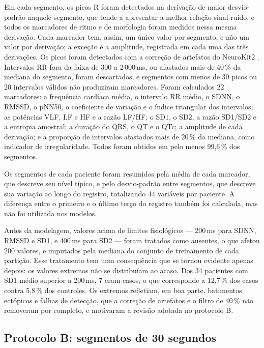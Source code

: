 Em cada segmento, os picos R foram detectados na derivação de maior
desvio-padrão naquele segmento, que tende a apresentar a melhor relação
sinal-ruído, e todos os marcadores de ritmo e de morfologia foram medidos
nessa mesma derivação. Cada marcador tem, assim, um único valor por
segmento, e não um valor por derivação; a exceção é a amplitude, registrada
em cada uma das três derivações. Os picos foram detectados com a
correção de artefatos do NeuroKit2 \cite{lipponen2019robust}. Intervalos RR
fora da faixa de 300 a 2\,000\,ms, ou afastados mais de 40\,\% da mediana do
segmento, foram descartados, e segmentos com menos de 30 picos ou 20
intervalos válidos não produziram marcadores. Foram calculados 22
marcadores: a frequência cardíaca média, o intervalo RR médio, o SDNN, o
RMSSD, o pNN50, o coeficiente de variação e o índice triangular dos
intervalos; as potências VLF, LF e HF e a razão LF/HF; o SD1, o SD2, a razão
SD1/SD2 e a entropia amostral; a duração do QRS, o QT e o QTc; a amplitude
de cada derivação; e a proporção de intervalos afastados mais de 20\,\% da
mediana, como indicador de irregularidade. Todos foram obtidos em pelo menos
99,6\,\% dos segmentos.

Os segmentos de cada paciente foram resumidos pela média de cada marcador,
que descreve seu nível típico, e pelo desvio-padrão entre segmentos, que
descreve sua variação ao longo do registro, totalizando 44 variáveis por
paciente. A diferença entre o primeiro e o último terço do registro também
foi calculada, mas não foi utilizada nos modelos.

Antes da modelagem, valores acima de limites fisiológicos --- 200\,ms para
SDNN, RMSSD e SD1, e 400\,ms para SD2 --- foram tratados como ausentes, o que
afetou 200 valores, e imputados pela mediana do conjunto de treinamento de
cada partição. Esse tratamento tem uma consequência que se tornou evidente
apenas depois: os valores extremos não se distribuíam ao acaso. Dos 34
pacientes com SD1 médio superior a 200\,ms, 7 eram casos, o que corresponde
a 12,7\,\% dos casos contra 5,8\,\% dos controles. Os extremos refletiam,
em boa parte, batimentos ectópicos e falhas de detecção, que a correção de
artefatos e o filtro de 40\,\% não removeram por completo, e motivaram a
revisão adotada no protocolo B.

\subsection{Protocolo B: segmentos de 30 segundos}
\label{subsec:met-protocolo-b}

